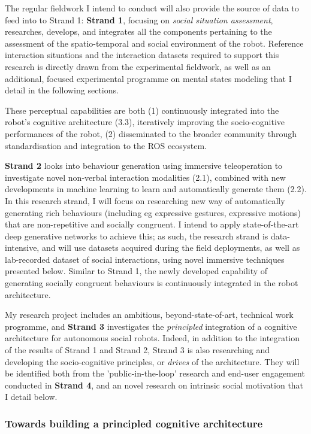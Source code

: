 The regular fieldwork I intend to conduct will also provide the source of data
to feed into to Strand 1: \textbf{Strand 1}, focusing on \emph{social situation
assessment}, researches, develops, and integrates all the components pertaining
to the assessment of the spatio-temporal and social environment of the robot.
Reference interaction situations and the interaction datasets required to
support this research is directly drawn from the experimental fieldwork, as well
as an additional, focused experimental programme on mental states modeling that
I detail in the following sections.

These perceptual capabilities are both (1) continuously integrated into the
robot's cognitive architecture (3.3), iteratively improving the socio-cognitive
performances of the robot, (2) disseminated to the broader community through
standardisation and integration to the ROS ecosystem.

\textbf{Strand 2} looks into behaviour generation using immersive teleoperation
to investigate novel non-verbal interaction modalities (2.1), combined with
new developments in machine learning to learn and automatically generate them
(2.2). In this research strand, I will focus on researching new way of
automatically generating rich behaviours (including eg expressive gestures,
expressive motions) that are non-repetitive and socially congruent. I intend to
apply state-of-the-art deep generative networks to achieve this; as such, the
research strand is data-intensive, and will use datasets acquired during the
field deployments, as well as lab-recorded dataset of social interactions, using
novel immersive techniques presented below. Similar to Strand 1, the newly
developed capability of generating socially congruent behaviours is continuously
integrated in the robot architecture.


My research project includes an ambitious, beyond-state-of-art, technical work
programme, and \textbf{Strand 3} investigates the \emph{principled} integration
of a cognitive architecture for autonomous social robots.  Indeed, in addition
to the integration of the results of Strand 1 and Strand 2, Strand 3 is also
researching and developing the socio-cognitive principles, or \emph{drives} of
the architecture. They will be identified both from the 'public-in-the-loop'
research and end-user engagement conducted in \textbf{Strand 4}, and an novel
research on intrinsic social motivation that I detail below.

\subsubsection{Towards building a principled cognitive architecture}

